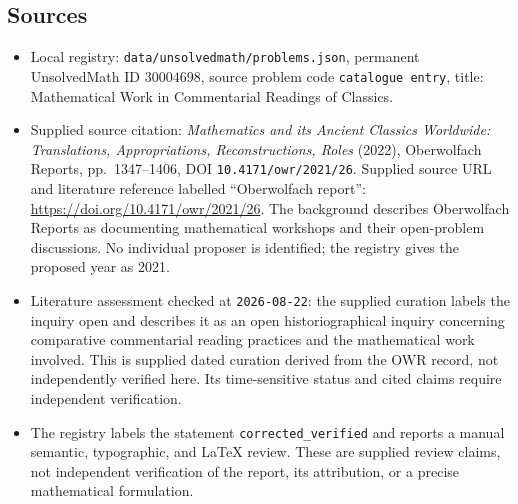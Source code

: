 \documentclass[11pt]{article}
\begin{document}
\subsection{Sources}
\begin{itemize}
\item Local registry: \texttt{data/unsolvedmath/problems.json}, permanent UnsolvedMath ID \(30004698\), source problem code \texttt{catalogue entry}, title: Mathematical Work in Commentarial Readings of Classics.
\item Supplied source citation: \emph{Mathematics and its Ancient Classics Worldwide: Translations, Appropriations, Reconstructions, Roles} (2022), Oberwolfach Reports, pp.\ 1347--1406, DOI \texttt{10.4171/owr/2021/26}. Supplied source URL and literature reference labelled ``Oberwolfach report'': \url{https://doi.org/10.4171/owr/2021/26}. The background describes Oberwolfach Reports as documenting mathematical workshops and their open-problem discussions. No individual proposer is identified; the registry gives the proposed year as 2021.
\item Literature assessment checked at \texttt{2026-08-22}: the supplied curation labels the inquiry open and describes it as an open historiographical inquiry concerning comparative commentarial reading practices and the mathematical work involved. This is supplied dated curation derived from the OWR record, not independently verified here. Its time-sensitive status and cited claims require independent verification.
\item The registry labels the statement \texttt{corrected\_verified} and reports a manual semantic, typographic, and LaTeX review. These are supplied review claims, not independent verification of the report, its attribution, or a precise mathematical formulation.
\end{itemize}
\end{document}
